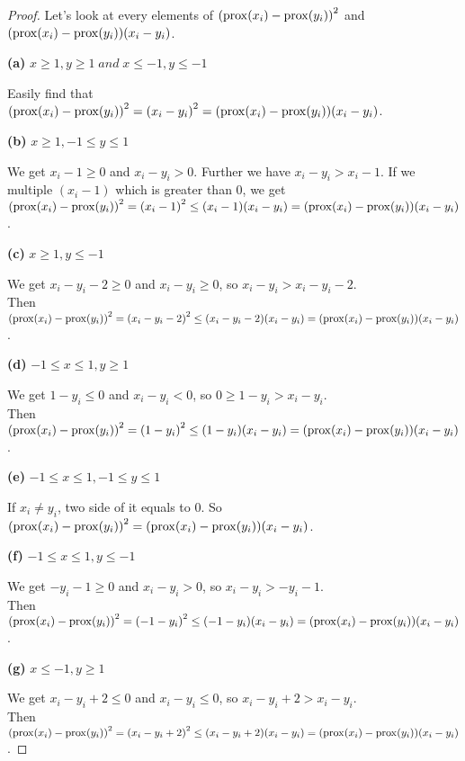 \documentclass{report}
\begin{document}
\begin{proof}
    Let's look at every elements of ${({\rm prox}(x_i)-{\rm prox}(y_i))}^2$ and $({\rm prox}(x_i)-{\rm prox}(y_i))(x_i-y_i)$.

    \newpage
    {\bf (a)} $x\geq 1,y\geq 1 \; and \; x\leq -1,y\leq -1$
    \par Easily find that ${({\rm prox}(x_i)-{\rm prox}(y_i))}^2={(x_i-y_i)}^2=({\rm prox}(x_i)-{\rm prox}(y_i))(x_i-y_i)$. 
    \vspace{1em}

    {\bf (b)} $x\geq 1,-1\leq y\leq 1$
    \par We get $x_i-1 \geq 0$ and $x_i-y_i >0$. 
    Further we have $x_i-y_i > x_i-1$. 
    If we multiple $(x_i-1)$ which is greater than 0, 
    we get
    ${({\rm prox}(x_i)-{\rm prox}(y_i))}^2 = {(x_i-1)}^2 \leq (x_i-1)(x_i-y_i) = ({\rm prox}(x_i)-{\rm prox}(y_i))(x_i-y_i)$. 
    \vspace{1em}

    {\bf (c)} $x\geq 1,y\leq -1$
    \par We get $x_i-y_i-2 \geq 0$ and $x_i-y_i \geq 0$, so $x_i-y_i> x_i-y_i-2$. \\
    Then ${({\rm prox}(x_i)-{\rm prox}(y_i))}^2 = {(x_i-y_i-2)}^2 \leq (x_i-y_i-2)(x_i-y_i) = ({\rm prox}(x_i)-{\rm prox}(y_i))(x_i-y_i)$. 
    \vspace{1em}
    
    {\bf (d)} $-1\leq x\leq 1,y\geq 1$
    \par We get $1-y_i\leq 0$ and $x_i-y_i<0$, so $0\geq 1-y_i>x_i-y_i$. \\
    Then ${({\rm prox}(x_i)-{\rm prox}(y_i))}^2 = {(1-y_i)}^2 \leq (1-y_i)(x_i-y_i) = ({\rm prox}(x_i)-{\rm prox}(y_i))(x_i-y_i)$. 
    \vspace{1em}

    {\bf (e)} $-1\leq x\leq 1,-1\leq y\leq 1$
    \par If $x_i \neq y_i$, two side of it equals to 0.
    So ${({\rm prox}(x_i)-{\rm prox}(y_i))}^2= ({\rm prox}(x_i)-{\rm prox}(y_i))(x_i-y_i)$. 
    \vspace{1em}

    {\bf (f)} $-1\leq x\leq 1,y\leq -1$ 
    \par We get $-y_i-1\geq 0$ and $x_i-y_i>0$, so $x_i-y_i>-y_i-1$. \\
    Then ${({\rm prox}(x_i)-{\rm prox}(y_i))}^2 = {(-1-y_i)}^2 \leq (-1-y_i)(x_i-y_i) = ({\rm prox}(x_i)-{\rm prox}(y_i))(x_i-y_i)$. 
    \vspace{1em}

    {\bf (g)} $x\leq -1,y\geq 1$ 
    \par We get $x_i-y_i+2 \leq 0$ and $x_i-y_i\leq 0$, so $x_i-y_i+2> x_i-y_i$. \\
    Then ${({\rm prox}(x_i)-{\rm prox}(y_i))}^2 = {(x_i-y_i+2)}^2 \leq (x_i-y_i+2)(x_i-y_i) = ({\rm prox}(x_i)-{\rm prox}(y_i))(x_i-y_i)$. 
    \vspace{1em}


\end{proof}
\end{document}
